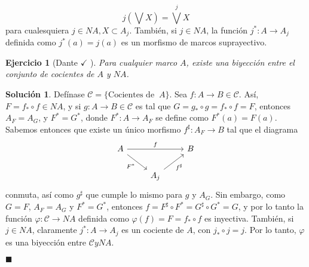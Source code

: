 \documentclass[12pt,letterpaper,titlepage]{article}
\newtheorem{exe}{Ejercicio}
\theoremstyle{definition}
\newtheorem*{sol}{Solución}
\newcommand\Sup{\bigvee}
\renewcommand\phi{\varphi}
\newcommand\<{\langle}
\renewcommand\>{\rangle}
\begin{document}
$$j(\Sup X)=\Sup^jX$$
para cualesquiera $j\in NA, X\subset A_j$.
También, si $j \in NA$, la función $j^*:A\to A_j$ definida como $j^*(a)=j(a)$ es un morfismo de marcos suprayectivo.
\begin{exe}[Dante $\checkmark$ ]
Para cualquier marco $A$, existe una biyección entre el conjunto de cocientes de $A$ y $NA$.
\end{exe}
\begin{sol}
    Defínase $\mathcal{C}=\{\text{Cocientes de } \ A\}$. Sea $f:A\to B\in \mathcal{C}$. Así, $F=f_*\circ f\in NA$, y si $g:A\to B\in\mathcal{C}$ es tal que $G=g_*\circ g=f_*\circ f=F$, entonces $A_F=A_G$, y $F^*=G^*$, donde $F^*:A\to A_F$ se define como $F^*(a)=F(a)$. Sabemos entonces que existe un único morfismo $f^\sharp:A_F\to B$ tal que el diagrama
    \[
        \begin{tikzcd}
            A \ar[rr,"f"] \ar[dr,"F^*"'] &&  B \\
            &A_j \ar[ur,"f^\sharp"']
        \end{tikzcd}
    \]
    conmuta, así como $g^\sharp$ que cumple lo mismo para $g$ y $A_G$. Sin embargo, como $G=F$, $A_F=A_G$ y $F^*=G^*$, entonces $f=F^\sharp\circ F^*=G^\sharp\circ G^*=G$, y por lo tanto la función $\phi:\mathcal{C}\to NA$ definida como $\phi(f)=F=f_*\circ f$ es inyectiva. También, si $j\in NA$, claramente $j^*:A\to A_j$ es un cociente de $A$, con $j_*\circ j =j$. Por lo tanto, $\phi$ es una biyección entre $\mathcal{C} y NA$.\vspace{3mm}
    
    \hfill $\blacksquare$
\end{sol}\vspace{3mm}
\end{document}
